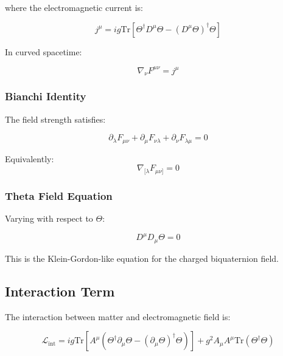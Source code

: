 where the electromagnetic current is:

\begin{equation}
\label{eq:canonical:em_current}
j^\mu = ig \text{Tr}\left[\Theta^\dagger D^\mu\Theta - (D^\mu\Theta)^\dagger \Theta\right]
\end{equation}

In curved spacetime:

\begin{equation}
\label{eq:canonical:maxwell_curved}
\nabla_\nu F^{\mu\nu} = j^\mu
\end{equation}

\subsubsection{Bianchi Identity}

The field strength satisfies:

\begin{equation}
\label{eq:canonical:bianchi}
\partial_\lambda F_{\mu\nu} + \partial_\mu F_{\nu\lambda} + \partial_\nu F_{\lambda\mu} = 0
\end{equation}

Equivalently:
\begin{equation}
\nabla_{[\lambda} F_{\mu\nu]} = 0
\end{equation}

\subsubsection{Theta Field Equation}

Varying with respect to $\Theta$:

\begin{equation}
\label{eq:canonical:theta_qed_equation}
D^\mu D_\mu\Theta = 0
\end{equation}

This is the Klein-Gordon-like equation for the charged biquaternion field.

\subsection{Interaction Term}

The interaction between matter and electromagnetic field is:

\begin{equation}
\label{eq:canonical:qed_interaction}
\mathcal{L}_{\text{int}} = ig \text{Tr}\left[A^\mu \left(\Theta^\dagger \partial_\mu\Theta - (\partial_\mu\Theta)^\dagger \Theta\right)\right] + g^2 A_\mu A^\mu \text{Tr}(\Theta^\dagger\Theta)
\end{equation}

